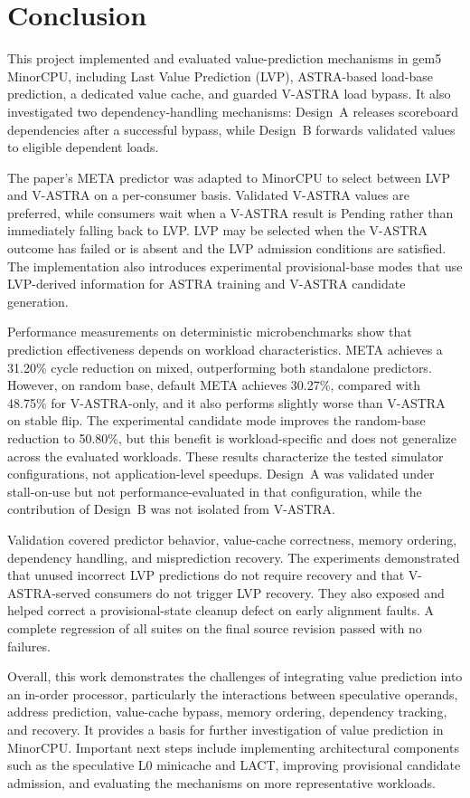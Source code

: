 \section{Conclusion}

This project implemented and evaluated value-prediction mechanisms
in gem5 MinorCPU, including Last Value Prediction (LVP),
ASTRA-based load-base prediction, a dedicated value cache, and
guarded V-ASTRA load bypass. It also investigated two
dependency-handling mechanisms: Design~A releases scoreboard
dependencies after a successful bypass, while Design~B forwards
validated values to eligible dependent loads.

The paper's META predictor was adapted to MinorCPU to select
between LVP and V-ASTRA on a per-consumer basis. Validated
V-ASTRA values are preferred, while consumers wait when a
V-ASTRA result is Pending rather than immediately falling back
to LVP. LVP may be selected when the V-ASTRA outcome has failed
or is absent and the LVP admission conditions are satisfied. The implementation also introduces experimental
provisional-base modes that use LVP-derived information for
ASTRA training and V-ASTRA candidate generation.

Performance measurements on deterministic microbenchmarks show
that prediction effectiveness depends on workload characteristics.
META achieves a 31.20\% cycle reduction on mixed,
outperforming both standalone predictors. However, on
random base, default META achieves 30.27\%, compared with
48.75\% for V-ASTRA-only, and it also performs slightly worse
than V-ASTRA on stable flip. The experimental candidate
mode improves the random-base reduction to 50.80\%, but this
benefit is workload-specific and does not generalize across the
evaluated workloads. These results characterize the tested simulator
configurations, not application-level speedups. Design~A was
validated under stall-on-use but not performance-evaluated in
that configuration, while the contribution of Design~B was not
isolated from V-ASTRA.

Validation covered predictor behavior, value-cache correctness,
memory ordering, dependency handling, and misprediction recovery.
The experiments demonstrated that unused incorrect LVP predictions
do not require recovery and that V-ASTRA-served consumers do not
trigger LVP recovery. They also exposed and helped correct a
provisional-state cleanup defect on early alignment faults. A complete
regression of all suites on the final source revision passed with no
failures.

Overall, this work demonstrates the challenges of integrating
value prediction into an in-order processor, particularly the
interactions between speculative operands, address prediction,
value-cache bypass, memory ordering, dependency tracking, and
recovery. It provides a basis for further investigation of value
prediction in MinorCPU. Important next steps include implementing architectural components
such as the speculative L0 minicache and LACT, improving provisional
candidate admission, and evaluating the mechanisms on more
representative workloads.
